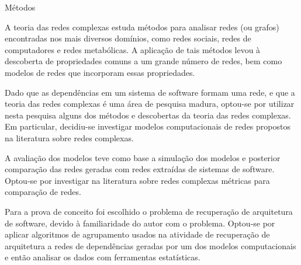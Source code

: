 \begin{section}{Métodos}
	
	A teoria das redes complexas estuda métodos para analisar redes (ou grafos) encontradas nos mais diversos domínios, como redes sociais, redes de computadores e redes metabólicas. A aplicação de tais métodos levou à descoberta de propriedades comuns a um grande número de redes, bem como modelos de redes que incorporam essas propriedades.
	
	Dado que as dependências em um sistema de software formam uma rede, e que a teoria das redes complexas é uma área de pesquisa madura, optou-se por utilizar nesta pesquisa alguns dos métodos e descobertas da teoria das redes complexas. Em particular, decidiu-se investigar modelos computacionais de redes propostos na literatura sobre redes complexas.

	A avaliação dos modelos teve como base a simulação dos modelos e posterior comparação das redes geradas com redes extraídas de sistemas de software. Optou-se por investigar na literatura sobre redes complexas métricas para comparação de redes.
	
	Para a prova de conceito foi escolhido o problema de recuperação de arquitetura de software, devido à familiaridade do autor com o problema. Optou-se por aplicar algoritmos de agrupamento usados na atividade de recuperação de arquitetura a redes de dependências geradas por um dos modelos computacionais e então analisar os dados com ferramentas estatísticas.

\end{section}

